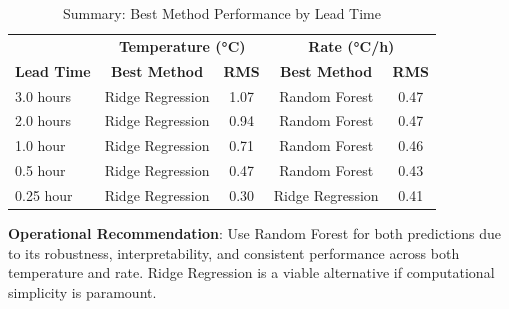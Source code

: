 \documentclass[11pt,letterpaper]{article}
\begin{document}
\begin{table}[H]
\centering
\caption{Summary: Best Method Performance by Lead Time}
\label{tab:best_by_leadtime}
\begin{tabular}{l|cc|cc}
\toprule
& \multicolumn{2}{c|}{\textbf{Temperature (°C)}} & \multicolumn{2}{c}{\textbf{Rate (°C/h)}} \\
\textbf{Lead Time} & \textbf{Best Method} & \textbf{RMS} & \textbf{Best Method} & \textbf{RMS} \\
\midrule
3.0 hours & Ridge Regression & 1.07 & Random Forest & 0.47 \\
2.0 hours & Ridge Regression & 0.94 & Random Forest & 0.47 \\
1.0 hour & Ridge Regression & 0.71 & Random Forest & 0.46 \\
0.5 hour & Ridge Regression & 0.47 & Random Forest & 0.43 \\
0.25 hour & Ridge Regression & 0.30 & Ridge Regression & 0.41 \\
\bottomrule
\end{tabular}
\end{table}

\textbf{Operational Recommendation}: Use Random Forest for both predictions due to its robustness, interpretability, and consistent performance across both temperature and rate. Ridge Regression is a viable alternative if computational simplicity is paramount.
\end{document}
